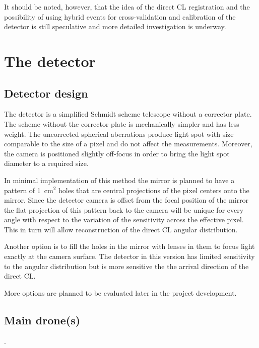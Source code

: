 \documentclass[a4paper,11pt]{article}
\begin{document}
It should be noted, however, that the idea of the direct CL registration and the possibility of using hybrid events for cross-validation and calibration of the detector is still speculative and more detailed investigation is underway.

\section{The detector}
\subsection{Detector design}

The detector is a simplified Schmidt scheme telescope without a corrector plate. %
The scheme without the corrector plate is mechanically simpler and has less weight. The uncorrected spherical aberrations produce light spot with size comparable to the size of a pixel and do not affect the measurements. Moreover, the camera is positioned slightly off-focus in order to bring the light spot diameter to a required size.

In minimal implementation of this method the mirror is planned to have a pattern of 1~cm$^2$ holes that are central projections of the pixel centers onto the mirror. Since the detector camera is offset from the focal position of the mirror the flat projection of this pattern back to the camera will be unique for every angle with respect to the variation of the sensitivity across the effective pixel. This in turn will allow reconstruction of the direct CL angular distribution.

Another option is to fill the holes in the mirror with lenses in them to focus light exactly at the camera surface. The detector in this version has limited sensitivity to the angular distribution but is more sensitive the the arrival direction of the direct CL.

More options are planned to be evaluated later in the project development.


\subsection{Main drone(s)}
.
\end{document}

